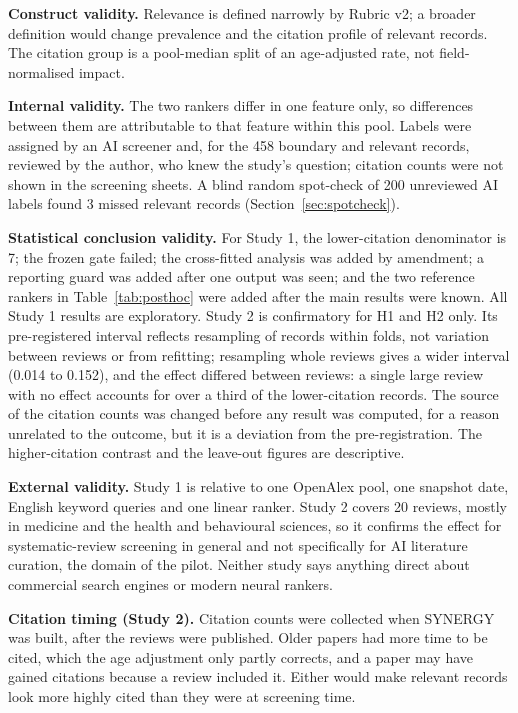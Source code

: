 \documentclass[acmsmall,screen,nonacm]{acmart}
\begin{document}
\textbf{Construct validity.} Relevance is defined narrowly by Rubric v2; a broader definition would change
prevalence and the citation profile of relevant records. The citation group is a pool-median split of an
age-adjusted rate, not field-normalised impact.

\textbf{Internal validity.} The two rankers differ in one feature only, so differences between them are
attributable to that feature within this pool. Labels were assigned by an AI screener and, for the 458
boundary and relevant records, reviewed by the author, who knew the study's question; citation counts were
not shown in the screening sheets. A blind random spot-check of 200 unreviewed AI labels found 3 missed
relevant records (Section~\ref{sec:spotcheck}).

\textbf{Statistical conclusion validity.} For Study 1, the lower-citation denominator is 7; the frozen gate failed;
the cross-fitted analysis was added by amendment; a reporting guard was added after one output was
seen; and the two reference rankers in Table~\ref{tab:posthoc} were added after the main results were known. All Study 1
results are exploratory. Study 2 is confirmatory for H1 and H2 only. Its pre-registered interval reflects resampling of
records within folds, not variation between reviews or from refitting; resampling whole reviews gives a
wider interval (0.014 to 0.152), and the effect differed between reviews: a single large review with no
effect accounts for over a third of the lower-citation records.
The source of the citation counts was changed before any result was computed, for a reason unrelated to
the outcome, but it is a deviation from the pre-registration. The higher-citation contrast and the
leave-out figures are descriptive.

\textbf{External validity.} Study 1 is relative to one OpenAlex pool, one snapshot date, English keyword
queries and one linear ranker. Study 2 covers 20 reviews, mostly in medicine and the health and behavioural sciences, so it confirms the
effect for systematic-review screening in general and not specifically for AI literature curation, the
domain of the pilot. Neither study says anything direct about commercial search engines or modern neural
rankers.

\textbf{Citation timing (Study 2).} Citation counts were collected when SYNERGY was built, after the
reviews were published. Older papers had more time to be cited, which the age adjustment only partly
corrects, and a paper may have gained citations because a review included it. Either would make relevant
records look more highly cited than they were at screening time.
\end{document}
